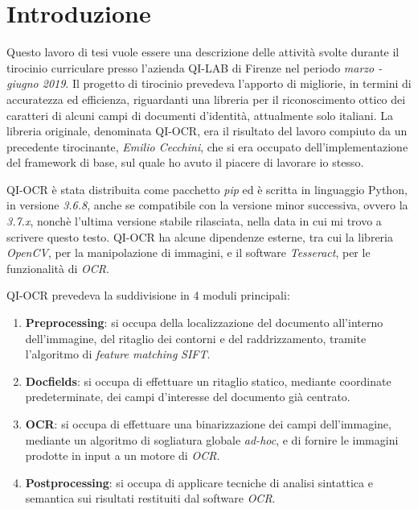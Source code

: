 \chapter*{Introduzione}

Questo lavoro di tesi vuole essere una descrizione delle attivit\`a svolte durante il tirocinio curriculare presso l'azienda QI-LAB di Firenze nel periodo \textit{marzo - giugno 2019}. Il progetto di tirocinio prevedeva l'apporto di migliorie, in termini di accuratezza ed efficienza, riguardanti una libreria per il riconoscimento ottico dei caratteri di alcuni campi di documenti d'identit\`a, attualmente solo italiani. La libreria originale, denominata QI-OCR, era il risultato del lavoro compiuto da un precedente tirocinante, \textit{Emilio Cecchini}, che si era occupato dell'implementazione del framework di base, sul quale ho avuto il piacere di lavorare io stesso.\par
QI-OCR \`e stata distribuita come pacchetto \textit{pip} ed \`e scritta in linguaggio Python, in versione \textit{3.6.8}, anche se compatibile con la versione minor successiva, ovvero la \textit{3.7.x}, nonch\`e l'ultima versione stabile rilasciata, nella data in cui mi trovo a scrivere questo testo. QI-OCR ha alcune dipendenze esterne, tra cui la libreria \textit{OpenCV}, per la manipolazione di immagini, e il software \textit{Tesseract}, per le funzionalit\`a di \textit{OCR}.\par
QI-OCR prevedeva la suddivisione in 4 moduli principali:
\begin{enumerate}
	\item \textbf{Preprocessing}: si occupa della localizzazione del documento all'interno dell'immagine, del ritaglio dei contorni e del raddrizzamento, tramite l'algoritmo di \textit{feature matching} \textit{SIFT}.
	\item \textbf{Docfields}: si occupa di effettuare un ritaglio statico, mediante coordinate predeterminate, dei campi d'interesse del documento gi\`a centrato.
	\item \textbf{OCR}: si occupa di effettuare una binarizzazione dei campi dell'immagine, mediante un algoritmo di sogliatura globale \textit{ad-hoc}, e di fornire le immagini prodotte in input a un motore di \textit{OCR}.
	\item \textbf{Postprocessing}: si occupa di applicare tecniche di analisi sintattica e semantica sui risultati restituiti dal software \textit{OCR}.
\end{enumerate}\par
